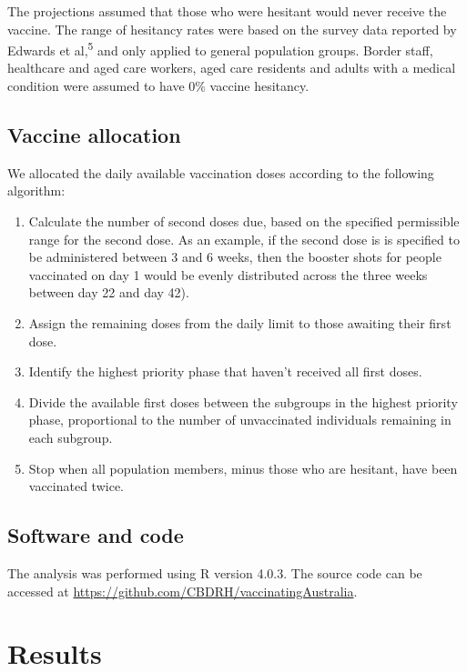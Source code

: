 \documentclass{article}
\begin{document}
The projections assumed that those who were hesitant would never receive
the vaccine. The range of hesitancy rates were based on the survey data
reported by Edwards et al,\textsuperscript{5} and only applied to
general population groups. Border staff, healthcare and aged care
workers, aged care residents and adults with a medical condition were
assumed to have 0\% vaccine hesitancy.

\hypertarget{vaccine-allocation}{%
\subsection{Vaccine allocation}\label{vaccine-allocation}}

We allocated the daily available vaccination doses according to the
following algorithm:

\begin{enumerate}
\def\labelenumi{\arabic{enumi}.}
\item
  Calculate the number of second doses due, based on the specified
  permissible range for the second dose. As an example, if the second
  dose is is specified to be administered between 3 and 6 weeks, then
  the booster shots for people vaccinated on day 1 would be evenly
  distributed across the three weeks between day 22 and day 42).
\item
  Assign the remaining doses from the daily limit to those awaiting
  their first dose.
\item
  Identify the highest priority phase that haven't received all first
  doses.
\item
  Divide the available first doses between the subgroups in the highest
  priority phase, proportional to the number of unvaccinated individuals
  remaining in each subgroup.
\item
  Stop when all population members, minus those who are hesitant, have
  been vaccinated twice.
\end{enumerate}

\hypertarget{software-and-code}{%
\subsection{Software and code}\label{software-and-code}}

The analysis was performed using R version 4.0.3. The source code can be
accessed at \url{https://github.com/CBDRH/vaccinatingAustralia}.

\hypertarget{results}{%
\section{Results}\label{results}}
\end{document}
